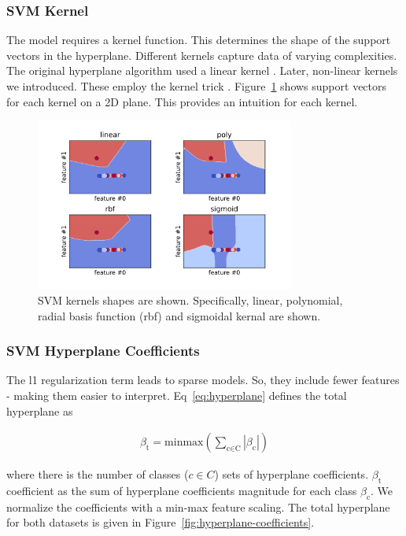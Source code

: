 \documentclass[runningheads]{llncs}
\begin{document}
\subsubsection{SVM Kernel}
\label{sec:background-svm-kernel}

The model requires a kernel function.
This determines the shape of the support vectors in the hyperplane.
Different kernels capture data of varying complexities.
The original hyperplane algorithm used a linear kernel \cite{aizerman1964theoretical}.
Later, non-linear kernels we introduced.
These employ the kernel trick \cite{boser1992training}.
Figure~\ref{fig:kernels} shows support vectors for each kernel on a 2D plane.
This provides an intuition for each kernel.

\begin{figure}[htb]
  \centering
  \includegraphics[width=8.5cm]{kernels.png}
  \caption{
    SVM kernels shapes are shown.
    Specifically, linear, polynomial, radial basis function (rbf) and sigmoidal kernal are shown.}
  \label{fig:kernels}
\end{figure}

\subsubsection{SVM Hyperplane Coefficients}
\label{sec:background-svm-hyperplane}

The l1 regularization term leads to sparse models.
So, they include fewer features - making them easier to interpret.
Eq~\ref{eq:hyperplane} defines the total hyperplane as

\begin{align}\label{eq:hyperplane}
  \beta_{\text{t}} = \text{minmax}(
  \sum_{\text{c} \in \text{C}}
  |\beta_{\text{c}}|
  )
\end{align}

where there is the number of classes ($c \in C$) sets of hyperplane coefficients.
$\beta_{\text{t}}$ coefficient as the sum of hyperplane coefficients magnitude for each class $\beta_{\text{c}}$.
We normalize the coefficients with a min-max feature scaling.
The total hyperplane for both datasets is given in Figure~\ref{fig:hyperplane-coefficients}.
\end{document}
